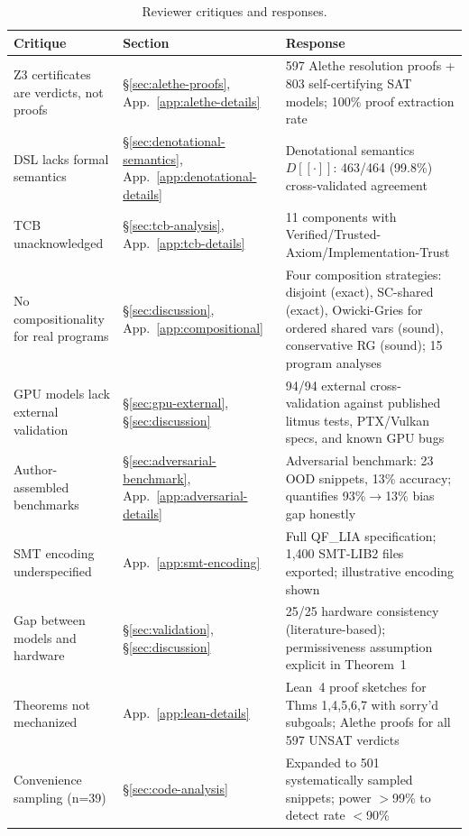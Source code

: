 \documentclass[11pt]{article}
\begin{document}
\begin{longtable}{p{5cm}p{2cm}p{5cm}}
\caption{Reviewer critiques and responses.}
\label{tab:critique-response} \\
\toprule
\textbf{Critique} & \textbf{Section} & \textbf{Response} \\
\midrule
\endfirsthead
\endhead
\bottomrule
\endfoot
Z3 certificates are verdicts, not proofs &
  \S\ref{sec:alethe-proofs}, App.~\ref{app:alethe-details} &
  597 Alethe resolution proofs + 803 self-certifying SAT models;
  100\% proof extraction rate \\
DSL lacks formal semantics &
  \S\ref{sec:denotational-semantics}, App.~\ref{app:denotational-details} &
  Denotational semantics $D[\![\cdot]\!]$: 463/464 (99.8\%)
  cross-validated agreement \\
TCB unacknowledged &
  \S\ref{sec:tcb-analysis}, App.~\ref{app:tcb-details} &
  11 components with Verified/Trusted-Axiom/Implementation-Trust \\
No compositionality for real programs &
  \S\ref{sec:discussion}, App.~\ref{app:compositional} &
  Four composition strategies: disjoint (exact), SC-shared (exact),
  Owicki-Gries for ordered shared vars (sound),
  conservative RG (sound); 15 program analyses \\
GPU models lack external validation &
  \S\ref{sec:gpu-external}, \S\ref{sec:discussion} &
  94/94 external cross-validation against published litmus tests,
  PTX/Vulkan specs, and known GPU bugs \\
Author-assembled benchmarks &
  \S\ref{sec:adversarial-benchmark}, App.~\ref{app:adversarial-details} &
  Adversarial benchmark: 23 OOD snippets, 13\% accuracy;
  quantifies 93\%$\to$13\% bias gap honestly \\
SMT encoding underspecified &
  App.~\ref{app:smt-encoding} &
  Full QF\_LIA specification; 1{,}400 SMT-LIB2 files exported;
  illustrative encoding shown \\
Gap between models and hardware &
  \S\ref{sec:validation}, \S\ref{sec:discussion} &
  25/25 hardware consistency (literature-based);
  permissiveness assumption explicit in Theorem~1 \\
Theorems not mechanized &
  App.~\ref{app:lean-details} &
  Lean~4 proof sketches for Thms 1,4,5,6,7 with sorry'd subgoals;
  Alethe proofs for all 597 UNSAT verdicts \\
Convenience sampling (n=39) &
  \S\ref{sec:code-analysis} &
  Expanded to 501 systematically sampled snippets;
  power $>$99\% to detect rate $<$90\% \\

\end{longtable}
\end{document}
